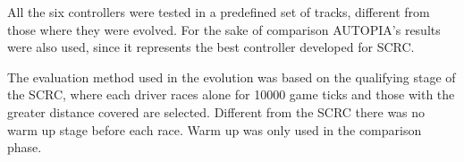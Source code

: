 	All the six controllers were tested in a predefined set of tracks, different from those where they were evolved. For the sake of comparison AUTOPIA's results were also used, since it represents the best controller developed for SCRC.
	
	
	The evaluation method used in the evolution was based on the qualifying stage of the SCRC, where each driver races alone for 10000 game ticks and those with the greater distance covered are selected. Different from the SCRC there was no warm up stage before each race.
	Warm up was only used in the comparison phase. %
	
	